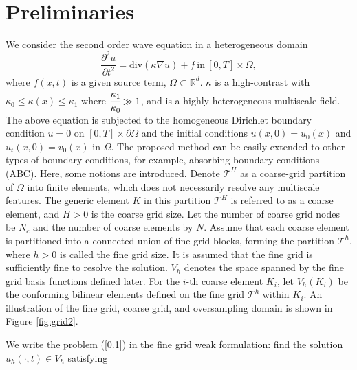 \documentclass[preprint,12pt]{elsarticle}
\begin{document}
\section{Preliminaries}\label{002}
We consider the second order wave equation in a heterogeneous domain
\begin{equation}\label{0.1}
    \frac{\partial^2 u}{\partial t^2}=\text{div}(\kappa\nabla u)+f~\mathrm{in}~[0,T]\times\Omega,
\end{equation}
where $f(x,t)$ is a given source term, $\Omega\subset\mathbb{R}^{d}$. $\kappa$ is a high-contrast with $\kappa_0 \leq \kappa(x)\leq\kappa_1$ where $\cfrac{\kappa_1}{\kappa_0}\gg 1$, and is a highly heterogeneous multiscale field. The above equation is subjected to the homogeneous Dirichlet boundary condition $u=0$ on $[0,T]\times \partial\Omega $ and the initial conditions $u(x,0)=u_0(x)$ and $u_t(x,0)=v_0(x)$ in $\Omega$.
The proposed method can be easily extended to other types of boundary conditions, for example, absorbing boundary conditions (ABC). 
Here, some notions are introduced. Denote $\mathcal{T}^H$ as a coarse-grid partition of $\Omega$ into finite elements, which does not necessarily resolve any multiscale features. The generic element $K$ in this partition $\mathcal{T}^H$ is referred to as a coarse element, and $H>0$ is the coarse grid size. Let the number of coarse grid nodes be $N_c$ and the number of coarse elements by $N$. Assume that each coarse element is partitioned into a connected union of fine grid blocks, forming the partition $\mathcal{T}^h$, where $h>0$ is called the fine grid size. It is assumed that the fine grid is sufficiently fine to resolve the solution. $V_h$ denotes the space spanned by the fine grid basis functions defined later. For the $i$-th coarse element $K_i$, let $V_h(K_i)$ be the conforming bilinear elements defined on the fine grid $\mathcal{T}^h$ within $K_i$. An illustration of the fine grid, coarse grid, and oversampling domain is shown in Figure \ref{fig:grid2}.

We write the problem (\ref{0.1}) in the fine grid weak formulation: find the solution $u_h(\cdot,t)\in V_h$ satisfying
  
\end{document}
